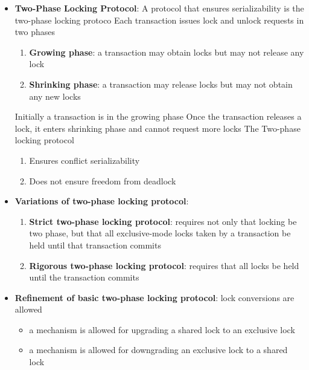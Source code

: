 \documentclass{report}
\begin{document}
\begin{itemize}
\begin{itemize}
            \end{itemize}
        \item \textbf{Two-Phase Locking Protocol}: A protocol that ensures serializability is the two-phase locking protoco
            \bigbreak \noindent 
             Each transaction issues lock and unlock requests in two phases
             \begin{enumerate}
                 \item \textbf{Growing phase}: a transaction may obtain locks but may not release any lock
                 \item \textbf{Shrinking phase}: a transaction may release locks but may not obtain any new locks
             \end{enumerate}
             \bigbreak \noindent 
             Initially a transaction is in the growing phase
             \bigbreak \noindent 
            Once the transaction releases a lock, it enters shrinking phase and cannot request more locks
            \bigbreak \noindent 
            The Two-phase locking protocol
            \begin{enumerate}
                \item Ensures conflict serializability
                \item Does not ensure freedom from deadlock
            \end{enumerate}
        \item \textbf{Variations of two-phase locking protocol}:
            \begin{enumerate}
                \item \textbf{Strict two-phase locking protocol}: requires not only that locking be two phase, but that all exclusive-mode locks taken by a transaction be held until that transaction commits
                \item \textbf{Rigorous two-phase locking protocol}: requires that all locks be held until the transaction commits
            \end{enumerate}
        \item \textbf{Refinement of basic two-phase locking protocol}: lock conversions are allowed
            \begin{itemize}
                \item a mechanism is allowed for upgrading a shared lock to an exclusive lock
                \item a mechanism is allowed for downgrading an exclusive lock to a shared lock
            \end{itemize}

\end{itemize}
\end{document}
